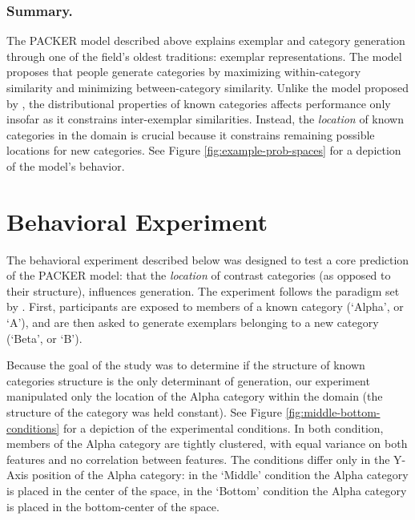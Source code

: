 \documentclass[10pt,letterpaper]{article}
\newcommand\inputpgf[2]{{
\let\pgfimageWithoutPath\pgfimage
\renewcommand{\pgfimage}[2][]{\pgfimageWithoutPath[##1]{#1/##2}}

}}
\begin{document}
\subsubsection{Summary.}
The PACKER model described above explains exemplar and category generation through one of the field's oldest traditions: exemplar representations. The model proposes that people generate categories by maximizing within-category similarity and minimizing between-category similarity. Unlike the model proposed by \citet{jern2013probabilistic}, the distributional properties of known categories affects performance only insofar as it constrains inter-exemplar similarities. Instead, the \textit{location} of known categories in the domain is crucial because it constrains remaining possible locations for new categories. See Figure \ref{fig:example-prob-spaces} for a depiction of the model's behavior.

\begin{figure*}
    \begin{center}
    \inputpgf{figs/}{example-prob-spaces.pgf}
    \caption{Predicted generation of a category `B' example, following exposure to one member of category `A' and one member of category `B'. Areas in which generation is not likely are shaded white; high probability areas are shaded blue. \textit{Left}: Predictions given $\{\phi = 1$, $\gamma = 0\}$ (contrast influence only). \textit{Center}: Predictions given $\{\phi = 0$, $\gamma = 1\}$ (target influence only).  \textit{Right}: Predictions given $\{\phi = 1$, $\gamma = 1\}$ (both constraints considered).  }
    \label{fig:example-prob-spaces}
    \end{center}
\end{figure*}

\section{Behavioral Experiment}

The behavioral experiment described below was designed to test a core prediction of the PACKER model: that the \textit{location} of contrast categories (as opposed to their structure), influences generation. The experiment follows the paradigm set by \citet{jern2013probabilistic}. First, participants are exposed to members of a known category (`Alpha', or `A'), and are then asked to generate exemplars belonging to a new category (`Beta', or `B').

Because the goal of the study was to determine if the structure of known categories structure is the only determinant of generation, our experiment manipulated only the location of the Alpha category within the domain (the structure of the category was held constant). See Figure \ref{fig:middle-bottom-conditions} for a depiction of the experimental conditions. In both condition, members of the Alpha category are tightly clustered, with equal variance on both features and no correlation between features. The conditions differ only in the Y-Axis position of the Alpha category: in the `Middle' condition the Alpha category is placed in the center of the space, in the `Bottom' condition the Alpha category is placed in the bottom-center of the space. 
\end{document}
